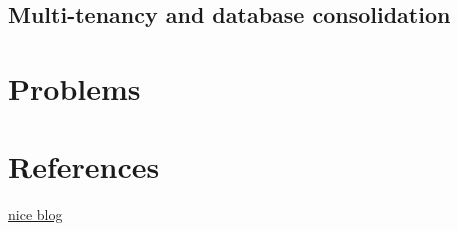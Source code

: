 \documentclass[11pt]{article}
\begin{document}
\subsection{Multi-tenancy and database consolidation}
\label{sec:org8e783ab}
\section{Problems}
\label{sec:orgfcef805}


\section{References}
\label{sec:org85423a0}
\href{https://fuzhe1989.github.io/2021/01/18/amazon-aurora/}{nice blog}

\label{bibliographystyle link}


\label{bibliography link}

\end{document}
